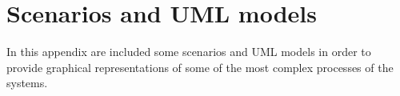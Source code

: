 \chapter{Scenarios and UML models}
In this appendix are included some scenarios and UML models in order to provide graphical representations of some of the most complex processes of the systems.





